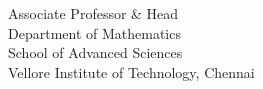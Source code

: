 \vspace{3\baselineskip}

\begin{minipage}[b]{.5\textwidth}
~
\end{minipage}%
\begin{minipage}[b]{.5\textwidth}
	\centering
	
	\textbf{\textsc{\thehod}}\\
	Associate Professor \& Head\\
	Department of Mathematics\\
	School of Advanced Sciences\\
	Vellore Institute of Technology, Chennai
	
%	
\end{minipage}

\endgroup
\raggedbottom
\cleardoublepage
%
%  